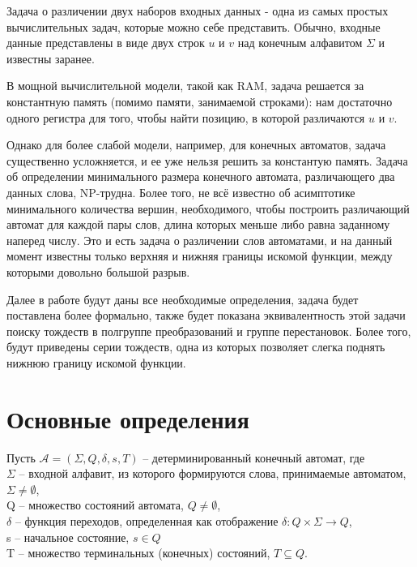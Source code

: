 
Задача о различении двух наборов входных данных - одна из самых простых вычислительных задач, которые можно себе представить. Обычно, входные данные представлены в виде двух строк $u$ и $v$ над конечным алфавитом $\Sigma$ и известны заранее. 

В мощной вычислительной модели, такой как RAM, задача решается за константную память (помимо памяти, занимаемой строками): нам достаточно одного регистра для того, чтобы найти позицию, в которой различаются $u$ и $v$. 

Однако для более слабой модели, например, для конечных автоматов, задача существенно усложняется, и ее уже нельзя решить за константую память. Задача об определении минимального размера конечного автомата, различающего два данных слова, NP-трудна. Более того, не всё известно об асимптотике минимального количества вершин, необходимого, чтобы построить различающий автомат для каждой пары слов, длина которых меньше либо равна заданному наперед числу. Это и есть задача о различении слов автоматами, и на данный момент известны только верхняя и нижняя границы искомой функции, между которыми довольно большой разрыв.

Далее в работе будут даны все необходимые определения, задача будет поставлена более формально, также будет показана эквивалентность этой задачи поиску тождеств в полгруппе преобразований и группе перестановок. Более того, будут приведены серии тождеств, одна из которых позволяет слегка поднять нижнюю границу искомой функции. 

\newpage
\section{Основные определения}
Пусть $\mathscr{A} = (\Sigma, Q, \delta, s, T)$ – детерминированный конечный автомат, где 
\\ $\Sigma$ – входной алфавит, из которого формируются слова, принимаемые автоматом, $\Sigma \ne \emptyset$,
\\ Q – множество состояний автомата, $Q \ne \emptyset$,
\\ $\delta$ – функция переходов, определенная как отображение $\delta: Q \times \Sigma \rightarrow Q$, 
\\ s – начальное состояние, $s \in Q$
\\ T – множество терминальных (конечных) состояний, $T \subseteq Q$.

